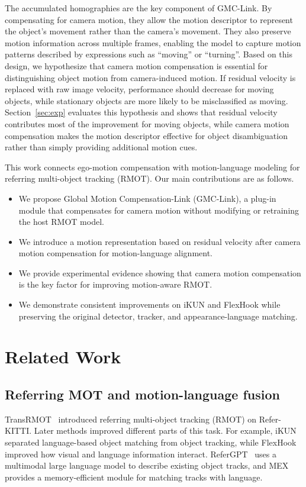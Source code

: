 \documentclass[sigconf,anonymous,nonacm]{acmart}
\begin{document}
The accumulated homographies are the key component of GMC-Link. By compensating for camera motion, they allow the motion descriptor to represent the object's movement rather than the camera's movement. They also preserve motion information across multiple frames, enabling the model to capture motion patterns described by expressions such as ``moving'' or ``turning''. Based on this design, we hypothesize that camera motion compensation is essential for distinguishing object motion from camera-induced motion. If residual velocity is replaced with raw image velocity, performance should decrease for moving objects, while stationary objects are more likely to be misclassified as moving. Section~\ref{sec:exp} evaluates this hypothesis and shows that residual velocity contributes most of the improvement for moving objects, while camera motion compensation makes the motion descriptor effective for object disambiguation rather than simply providing additional motion cues.

This work connects ego-motion compensation with motion-language modeling for referring multi-object tracking (RMOT). Our main contributions are as follows.
\begin{itemize}
  \item We propose Global Motion Compensation-Link (GMC-Link), a plug-in module that compensates for camera motion without modifying or retraining the host RMOT model.
  \item We introduce a motion representation based on residual velocity after camera motion compensation for motion-language alignment.
  \item We provide experimental evidence showing that camera motion compensation is the key factor for improving motion-aware RMOT.
  \item We demonstrate consistent improvements on iKUN and FlexHook while preserving the original detector, tracker, and appearance-language matching.
\end{itemize}

\section{Related Work}
\label{sec:related}

\subsection{Referring MOT and motion-language fusion}
TransRMOT~\cite{transrmot} introduced referring multi-object tracking (RMOT) on Refer-KITTI. Later methods improved different parts of this task. For example, iKUN~\cite{ikun} separated language-based object matching from object tracking, while FlexHook~\cite{flexhook} improved how visual and language information interact. ReferGPT~\cite{refergpt} uses a multimodal large language model to describe existing object tracks, and MEX~\cite{mex} provides a memory-efficient module for matching tracks with language.
\end{document}

